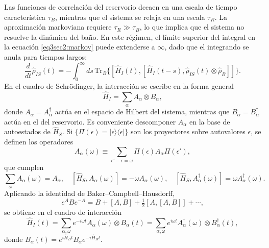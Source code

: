 Las funciones de correlación del reservorio decaen en una escala de tiempo característica $\tau_{B}$, mientras que el sistema se relaja en una escala $\tau_{R}$. La aproximación markoviana requiere $\tau_{R}\gg \tau_{B}$, lo que implica que el sistema no resuelve la dinámica del baño. En este régimen, el límite superior del integral en la ecuación \eqref{eq3sec2:markov} puede extenderse a $\infty$, dado que el integrando se anula para tiempos largos:
\begin{equation}
    \frac{d}{dt}\hat{\rho}_{IS}(t) = - \int_{0}^{\infty} ds \,\text{Tr}_{B}\{[\hat{H}_{I}(t), [\hat{H}_{I}(t-s), \hat{\rho}_{IS}(t) \otimes \hat{\rho}_{B}]]\}.
    \label{eq3sec2:markov1}
\end{equation}
En el cuadro de Schrödinger, la interacción se escribe en la forma general
\begin{equation*}
    \hat{H}_{I} = \sum_{\alpha} A_{\alpha} \otimes B_{\alpha},
\end{equation*}
donde $A_{\alpha}=A_{\alpha}^{\dagger}$ actúa en el espacio de Hilbert del sistema, mientras que $B_{\alpha}=B_{\alpha}^{\dagger}$ actúa en el del reservorio. Es conveniente descomponer $A_{\alpha}$ en la base de autoestados de $\hat{H}_{S}$. Si $\{\Pi(\epsilon)=|\epsilon\rangle\langle\epsilon|\}$ son los proyectores sobre autovalores $\epsilon$, se definen los operadores
\begin{equation}
    A_{\alpha}(\omega) \equiv \sum_{\epsilon'-\epsilon=\omega} \Pi(\epsilon)A_{\alpha}\Pi(\epsilon'),
    \label{sec1:globalA}
\end{equation}
que cumplen
\[
\sum_{\omega} A_{\alpha}(\omega) = A_{\alpha}, \quad
[\hat{H}_{S}, A_{\alpha}(\omega)] = -\omega A_{\alpha}(\omega), \quad
[\hat{H}_{S}, A_{\alpha}^{\dagger}(\omega)] = \omega A_{\alpha}^{\dagger}(\omega).
\]
Aplicando la identidad de Baker--Campbell--Hausdorff,
\begin{equation}
    e^{A}Be^{-A} = B + [A,B] + \tfrac{1}{2}[A,[A,B]] + \cdots,
    \label{sec2lind:baker}
\end{equation}
se obtiene en el cuadro de interacción
\begin{equation}
    \hat{H}_{I}(t) = \sum_{\alpha,\omega} e^{-i\omega t} A_{\alpha}(\omega) \otimes B_{\alpha}(t)
    = \sum_{\alpha,\omega} e^{i\omega t} A_{\alpha}^{\dagger}(\omega) \otimes B_{\alpha}^{\dagger}(t),
    \label{seclindbladinteraction1}
\end{equation}
donde $B_{\alpha}(t)=e^{i\hat{H}_{B}t}B_{\alpha}e^{-i\hat{H}_{B}t}$.
\\

